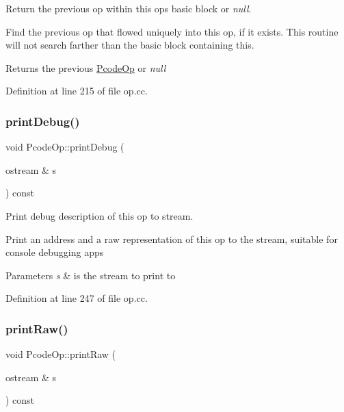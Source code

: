 Return the previous op within this op\textquotesingle{}s basic block or {\itshape null}. 

Find the previous op that flowed uniquely into this op, if it exists. This routine will not search farther than the basic block containing this. \begin{DoxyReturn}{Returns}
the previous \mbox{\hyperlink{class_pcode_op}{Pcode\+Op}} or {\itshape null} 
\end{DoxyReturn}


Definition at line 215 of file op.\+cc.

\mbox{\label{class_pcode_op_ad69a4ae6a740167e608f39ebc2b716df}} 
\subsubsection{\texorpdfstring{printDebug()}{printDebug()}}
{\footnotesize\ttfamily void Pcode\+Op\+::print\+Debug (\begin{DoxyParamCaption}\item[{ostream \&}]{s }\end{DoxyParamCaption}) const}



Print debug description of this op to stream. 

Print an address and a raw representation of this op to the stream, suitable for console debugging apps 
\begin{DoxyParams}{Parameters}
{\em s} & is the stream to print to \\
\hline
\end{DoxyParams}


Definition at line 247 of file op.\+cc.

\mbox{\label{class_pcode_op_ac0876c5f6b45db26101ff7ea1636e28f}} 
\subsubsection{\texorpdfstring{printRaw()}{printRaw()}}
{\footnotesize\ttfamily void Pcode\+Op\+::print\+Raw (\begin{DoxyParamCaption}\item[{ostream \&}]{s }\end{DoxyParamCaption}) const\hspace{0.3cm}{\ttfamily [inline]}}



